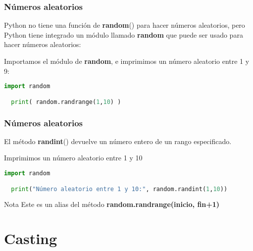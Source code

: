 \begin{frame}[fragile]
  \frametitle{Números aleatorios}

  Python no tiene una función de \textbf{random}() para
  hacer números aleatorios, pero Python tiene integrado un módulo llamado
  \textbf{random} que puede ser usado para hacer números
  aleatorios:

  \vspace{\baselineskip}
  Importamos el módulo de \textbf{random}, e imprimimos un
  número aleatorio entre 1 y 9:

  \begin{lstlisting}[language=Python]
  import random

  print( random.randrange(1,10) )
  \end{lstlisting}
\end{frame}

\begin{frame}[fragile]
  \frametitle{Números aleatorios}

  El método \textbf{randint}() devuelve un número
  entero de un rango especificado.

  \vspace{\baselineskip}
  Imprimimos un número aleatorio entre 1 y 10

  \vspace{\baselineskip}
  \begin{lstlisting}[language=Python]
  import random

  print("Número aleatorio entre 1 y 10:", random.randint(1,10))
  \end{lstlisting}

  \begin{alertblock}{Nota}
    Este es un alias del método \textbf{random.randrange(inicio, fin+1)}
  \end{alertblock}
\end{frame}

\section{Casting}

